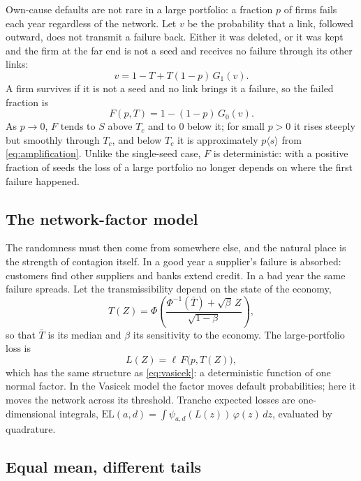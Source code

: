 \documentclass[11pt,a4paper]{article}
\theoremstyle{definition}
\theoremstyle{remark}
\newcommand{\avg}[1]{\langle #1 \rangle}
\begin{document}
Own-cause defaults are not rare in a large portfolio: a fraction $p$ of firms fails each year regardless of the network. Let $v$ be the probability that a link, followed outward, does not transmit a failure back. Either it was deleted, or it was kept and the firm at the far end is not a seed and receives no failure through its other links:
\begin{equation}
v = 1 - T + T(1-p)\,G_1(v).
\label{eq:v}
\end{equation}
A firm survives if it is not a seed and no link brings it a failure, so the failed fraction is
\begin{equation}
F(p, T) = 1 - (1-p)\,G_0(v).
\label{eq:F}
\end{equation}
As $p \to 0$, $F$ tends to $S$ above $T_c$ and to $0$ below it; for small $p>0$ it rises steeply but smoothly through $T_c$, and below $T_c$ it is approximately $p\avg{s}$ from \eqref{eq:amplification}. Unlike the single-seed case, $F$ is deterministic: with a positive fraction of seeds the loss of a large portfolio no longer depends on where the first failure happened.

\subsection{The network-factor model}

The randomness must then come from somewhere else, and the natural place is the strength of contagion itself. In a good year a supplier's failure is absorbed: customers find other suppliers and banks extend credit. In a bad year the same failure spreads. Let the transmissibility depend on the state of the economy,
\begin{equation}
T(Z) = \Phi\!\left( \frac{\Phi^{-1}(\bar T) + \sqrt{\beta}\,Z}{\sqrt{1-\beta}} \right),
\end{equation}
so that $\bar T$ is its median and $\beta$ its sensitivity to the economy. The large-portfolio loss is
\begin{equation}
L(Z) = \ell\, F\big(p, T(Z)\big),
\label{eq:netfactor}
\end{equation}
which has the same structure as \eqref{eq:vasicek}: a deterministic function of one normal factor. In the Vasicek model the factor moves default probabilities; here it moves the network across its threshold. Tranche expected losses are one-dimensional integrals, $\mathrm{EL}(a,d) = \int \psi_{a,d}(L(z))\,\varphi(z)\,dz$, evaluated by quadrature.

\subsection{Equal mean, different tails}
\end{document}
